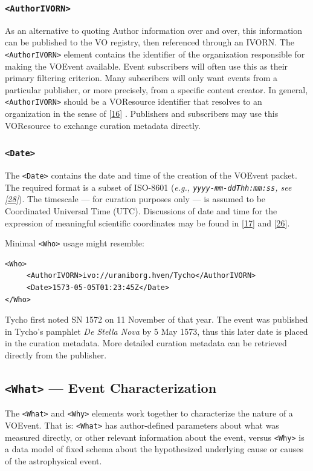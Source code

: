 \documentclass[11pt,a4paper]{ivoa}
\begin{document}
\subsubsection{\tt <AuthorIVORN>}
As an alternative to quoting Author information over and over, this information can be published to the VO registry, then referenced through an IVORN. The {\tt <AuthorIVORN>} element contains the identifier of the organization responsible for making the VOEvent available. Event subscribers will often use this as their primary filtering criterion. Many subscribers will only want events from a particular publisher, or more precisely, from a specific content creator. In general, {\tt <AuthorIVORN>} should be a VOResource identifier that resolves to an organization in the sense of [\hyperref[bib16]{16}]
. Publishers and subscribers may use this VOResource to exchange curation metadata directly. 

\subsubsection{\tt <Date>}
The {\tt <Date>} contains the date and time of the creation of the VOEvent packet. The required format is a subset of ISO-8601 (\emph{e.g., {\tt yyyy-mm-ddThh:mm:ss}, see [\hyperref[bib28]{28}]}). The timescale --- for curation purposes only --- is assumed to be Coordinated Universal Time (UTC). Discussions of date and time for the expression of meaningful scientific coordinates may be found in [\hyperref[bib17]{17}]
 and [\hyperref[bib26]{26}]. 

Minimal {\tt <Who>} usage might resemble: 
{\footnotesize
\begin{verbatim}
<Who>
     <AuthorIVORN>ivo://uraniborg.hven/Tycho</AuthorIVORN>
     <Date>1573-05-05T01:23:45Z</Date>
</Who> 
\end{verbatim}}
Tycho first noted SN 1572 on 11 November of that year. The event was published in Tycho's pamphlet \emph{De Stella Nova} by 5 May 1573, thus this later date is placed in the curation metadata. More detailed curation metadata can be retrieved directly from the publisher. 

\subsection{{\tt <What>} --- Event Characterization}
\label{sec:3.3}
The {\tt <What>} and {\tt <Why>} elements work together to characterize the nature of a VOEvent. That is: {\tt <What>} has author-defined parameters about what was measured directly, or other relevant information about the event, versus {\tt <Why>} is a data model of fixed schema about the hypothesized underlying cause or causes of the astrophysical event. 
\end{document}

